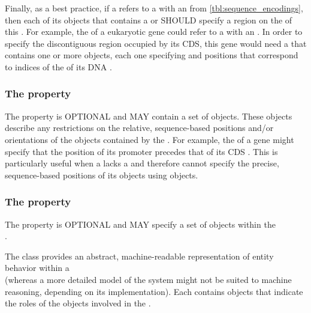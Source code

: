 Finally, as a best practice, if a  refers to a  with an   from \ref{tbl:sequence_encodings}, then each of its  objects that contains a  or  SHOULD specify a region on the  of this .
For example, the  of a eukaryotic gene could refer to a  with an  . In order to specify the discontiguous region occupied by its CDS, this gene  would need a  that contains one or more  objects, each one specifying  and  positions that correspond to indices of the  of its DNA .

\subsubsection*{The  property}
\label{sec:constraint}

The  property is OPTIONAL and MAY contain a set of  objects. 
These objects describe any restrictions on the relative, sequence-based positions and/or orientations of the  objects contained by the .
For example, the  of a gene might specify that the position of its promoter  precedes that of its CDS . This is particularly useful when a  lacks a  and therefore cannot specify the precise, sequence-based positions of its  objects using  objects.

\subsubsection*{The  property}\label{sec:interactions}

The  property is OPTIONAL and MAY specify a set of  objects within the\\
.

The  class provides an abstract, machine-readable representation of entity behavior within a\\  (whereas a more detailed model of the system might not be suited to machine reasoning, depending on its implementation).
Each  contains  objects that indicate the roles of the  objects involved in the .

